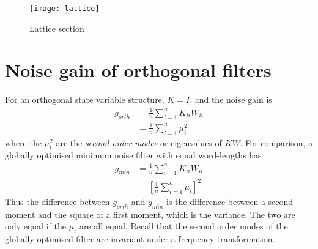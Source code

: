 \documentclass[a4paper,twoside,10pt,english]{report}
\begin{document}
\begin{figure}[tbh]
\centering
\texttt{[image: lattice]}
\caption{Lattice section}
\label{fig:Lattice-section}
\end{figure}
\section{Noise gain of orthogonal filters\label{sec:Noise-gain-of-orthogonal-filters}}
For an orthogonal state variable structure, $K=I$, and the noise
gain is
\begin{align*}
g_{orth} &= \frac{1}{n}\sum_{i=1}^{n}K_{ii}W_{ii}\\
 &= \frac{1}{n}\sum_{i=1}^{n}\mu_{i}^{2}
\end{align*}
where the $\mu_{i}^{2}$ are the \emph{second order modes} or eigenvalues
of $KW$. For comparison, a globally optimised minimum noise filter with 
equal word-lengths has
\begin{align*}
g_{min} &= \frac{1}{n}\sum_{i=1}^{n}K_{ii}W_{ii}\\
       &= \left[\frac{1}{n}\sum_{i=1}^{n}\mu_{i}\right]^{2}
\end{align*}
Thus the difference between $g_{orth}$ and $g_{min}$ is the difference
between a second moment and the square of a first moment, which is
the variance. The two are only equal if the $\mu_{i}$ are all equal.
Recall that the second order modes of the globally optimised filter are
invariant under a frequency transformation.
\end{document}
